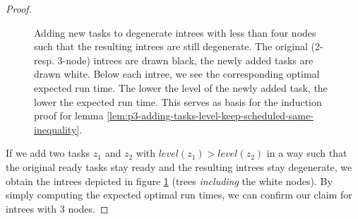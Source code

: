 \begin{proof}
\begin{figure}[t]
    \caption{Adding new tasks to degenerate intrees with less than four nodes such that the resulting intrees are still degenerate. The original (2- resp. 3-node) intrees are drawn black, the newly added tasks are drawn white. Below each intree, we see the corresponding optimal expected run time. The lower the level of the newly added task, the lower the expected run time. This serves as basis for the induction proof for lemma \ref{lem:p3-adding-tasks-level-keep-scheduled-same-inequality}.}
    \label{fig:p3-lemma-adding-intrees-induction-start}
  \end{figure}

  If we add two tasks $z_1$ and $z_2$ with $level(z_1)>level(z_2)$ in a way such that the original ready tasks stay ready and the resulting intrees stay degenerate, we obtain the intrees depicted in figure \ref{fig:p3-lemma-adding-intrees-induction-start} (trees \emph{including} the white nodes). By simply computing the expected optimal run times, we can confirm our claim for intrees with 3 nodes.


\end{proof}
